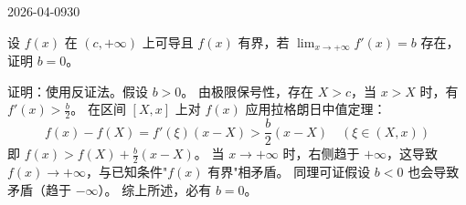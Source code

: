 \begin{mistake}{2026-04-09}{30}

\begin{problemcontent}
设 \( f(x) \) 在 \( (c, +\infty) \) 上可导且 \( f(x) \) 有界，若 \( \lim_{x \to +\infty} f'(x) = b \) 存在，证明 \( b = 0 \)。
\end{problemcontent}

\begin{solutioncontent}
证明：使用反证法。假设 \( b > 0 \)。
由极限保号性，存在 \( X > c \)，当 \( x > X \) 时，有 \( f'(x) > \frac{b}{2} \)。
在区间 \( [X, x] \) 上对 \( f(x) \) 应用拉格朗日中值定理：
\[
f(x) - f(X) = f'(\xi)(x-X) > \frac{b}{2}(x-X) \quad (\xi \in (X, x))
\]
即 \( f(x) > f(X) + \frac{b}{2}(x-X) \)。
当 \( x \to +\infty \) 时，右侧趋于 \( +\infty \)，这导致 \( f(x) \to +\infty \)，与已知条件"\( f(x) \) 有界"相矛盾。
同理可证假设 \( b < 0 \) 也会导致矛盾（趋于 \( -\infty \)）。
综上所述，必有 \( b = 0 \)。
\end{solutioncontent}


\end{mistake}
